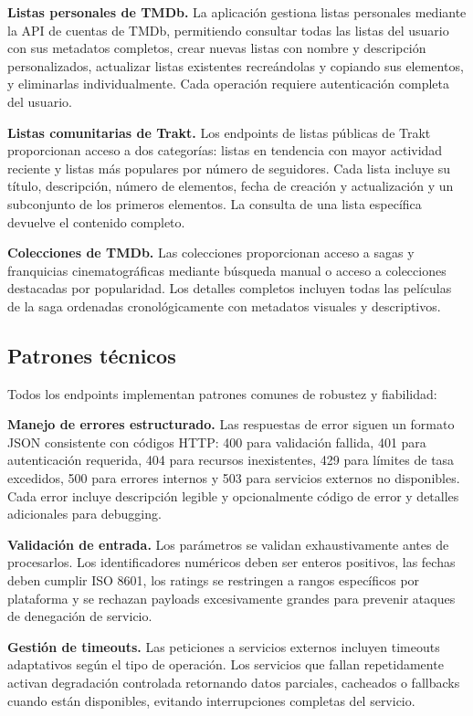 \textbf{Listas personales de TMDb.} La aplicación gestiona listas personales mediante la API de cuentas de TMDb, permitiendo consultar todas las listas del usuario con sus metadatos completos, crear nuevas listas con nombre y descripción personalizados, actualizar listas existentes recreándolas y copiando sus elementos, y eliminarlas individualmente. Cada operación requiere autenticación completa del usuario. 

\textbf{Listas comunitarias de Trakt.} Los endpoints de listas públicas de Trakt proporcionan acceso a dos categorías: listas en tendencia con mayor actividad reciente y listas más populares por número de seguidores. Cada lista incluye su título, descripción, número de elementos, fecha de creación y actualización y un subconjunto de los primeros elementos. La consulta de una lista específica devuelve el contenido completo.

\textbf{Colecciones de TMDb.} Las colecciones proporcionan acceso a sagas y franquicias cinematográficas mediante búsqueda manual o acceso a colecciones destacadas por popularidad. Los detalles completos incluyen todas las películas de la saga ordenadas cronológicamente con metadatos visuales y descriptivos.

\subsection{Patrones técnicos}

Todos los endpoints implementan patrones comunes de robustez y fiabilidad:

\textbf{Manejo de errores estructurado.} Las respuestas de error siguen un formato JSON consistente con códigos HTTP: 400 para validación fallida, 401 para autenticación requerida, 404 para recursos inexistentes, 429 para límites de tasa excedidos, 500 para errores internos y 503 para servicios externos no disponibles. Cada error incluye descripción legible y opcionalmente código de error y detalles adicionales para debugging.

\textbf{Validación de entrada.} Los parámetros se validan exhaustivamente antes de procesarlos. Los identificadores numéricos deben ser enteros positivos, las fechas deben cumplir ISO 8601, los ratings se restringen a rangos específicos por plataforma y se rechazan payloads excesivamente grandes para prevenir ataques de denegación de servicio.

\textbf{Gestión de timeouts.} Las peticiones a servicios externos incluyen timeouts adaptativos según el tipo de operación. Los servicios que fallan repetidamente activan degradación controlada retornando datos parciales, cacheados o fallbacks cuando están disponibles, evitando interrupciones completas del servicio.

